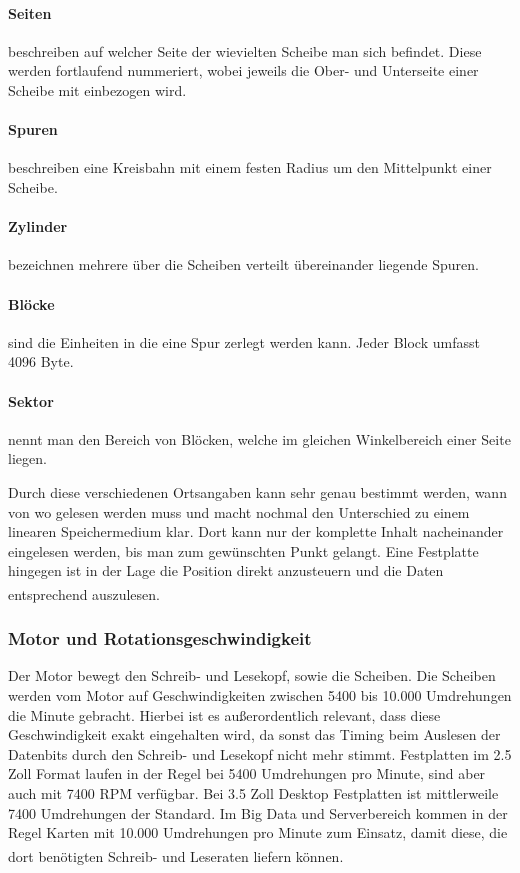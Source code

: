 \documentclass[a4paper, DIV20, 12pt, headsepline, parskip, flushleft]{scrartcl}
\begin{document}
\paragraph{Seiten} beschreiben auf welcher Seite der wievielten Scheibe man sich befindet. Diese werden fortlaufend nummeriert, wobei jeweils die Ober- und Unterseite einer Scheibe mit einbezogen wird.
\paragraph{Spuren} beschreiben eine Kreisbahn mit einem festen Radius um den Mittelpunkt einer Scheibe.
\paragraph{Zylinder} bezeichnen mehrere über die Scheiben verteilt übereinander liegende Spuren.
\paragraph{Blöcke} sind die Einheiten in die eine Spur zerlegt werden kann. Jeder Block umfasst 4096 Byte.
\paragraph{Sektor} nennt man den Bereich von Blöcken, welche im gleichen Winkelbereich einer Seite liegen.

Durch diese verschiedenen Ortsangaben kann sehr genau bestimmt werden, wann von wo gelesen werden muss und macht nochmal den Unterschied zu einem linearen Speichermedium klar. Dort kann nur der komplette Inhalt nacheinander eingelesen werden, bis man zum gewünschten Punkt gelangt. Eine Festplatte hingegen ist in der Lage die Position direkt anzusteuern und die Daten entsprechend auszulesen. \textsuperscript{\cite{vid:hdd}}

\subsubsection{Motor und Rotationsgeschwindigkeit}
Der Motor bewegt den Schreib- und Lesekopf, sowie die Scheiben.
Die Scheiben werden vom Motor auf Geschwindigkeiten zwischen 5400 bis 10.000 Umdrehungen die Minute gebracht.
Hierbei ist es außerordentlich relevant, dass diese Geschwindigkeit exakt eingehalten wird, da sonst das Timing beim Auslesen der Datenbits durch den Schreib- und Lesekopf nicht mehr stimmt. 
Festplatten im 2.5 Zoll Format laufen in der Regel bei 5400 Umdrehungen pro Minute, sind aber auch mit 7400 RPM verfügbar. Bei 3.5 Zoll Desktop Festplatten ist mittlerweile 7400 Umdrehungen der Standard. Im Big Data und Serverbereich kommen in der Regel Karten mit 10.000 Umdrehungen pro Minute zum Einsatz, damit diese, die dort benötigten Schreib- und Leseraten liefern können. \textsuperscript{\cite{elk}}
\end{document}
